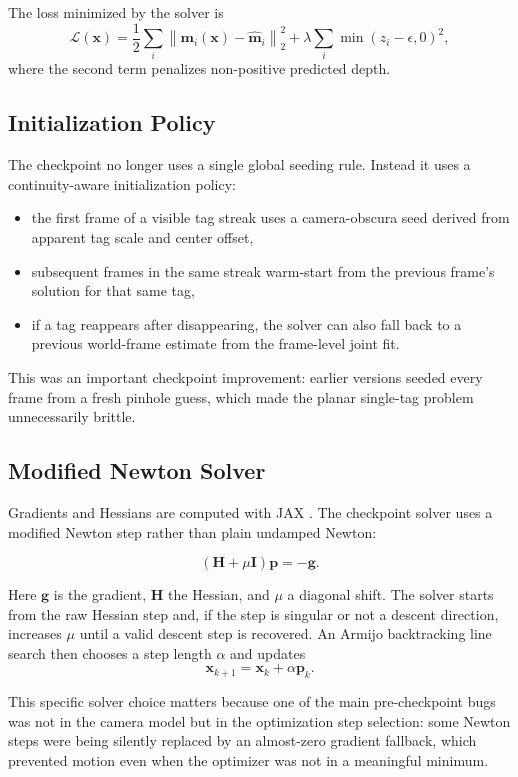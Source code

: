 \documentclass[11pt,a4paper]{article}
\begin{document}
The loss minimized by the solver is
\[
\mathcal{L}(\mathbf{x})
=
\frac{1}{2}\sum_i \left\lVert \mathbf{m}_i(\mathbf{x}) - \hat{\mathbf{m}}_i \right\rVert_2^2
+
\lambda \sum_i \min(z_i - \epsilon, 0)^2,
\]
where the second term penalizes non-positive predicted depth.

\subsection{Initialization Policy}

The checkpoint no longer uses a single global seeding rule.
Instead it uses a continuity-aware initialization policy:

\begin{itemize}
  \item the first frame of a visible tag streak uses a camera-obscura seed derived from apparent tag scale and center offset,
  \item subsequent frames in the same streak warm-start from the previous frame's solution for that same tag,
  \item if a tag reappears after disappearing, the solver can also fall back to a previous world-frame estimate from the frame-level joint fit.
\end{itemize}

This was an important checkpoint improvement: earlier versions seeded every frame from a fresh pinhole guess, which made the planar single-tag problem unnecessarily brittle.

\subsection{Modified Newton Solver}

Gradients and Hessians are computed with JAX \citep{bradbury2018jax}.
The checkpoint solver uses a modified Newton step rather than plain undamped Newton:

\[
(\mathbf{H} + \mu \mathbf{I}) \mathbf{p} = -\mathbf{g}.
\]

Here $\mathbf{g}$ is the gradient, $\mathbf{H}$ the Hessian, and $\mu$ a diagonal shift.
The solver starts from the raw Hessian step and, if the step is singular or not a descent direction, increases $\mu$ until a valid descent step is recovered.
An Armijo backtracking line search then chooses a step length $\alpha$ and updates
\[
\mathbf{x}_{k+1} = \mathbf{x}_k + \alpha \mathbf{p}_k.
\]

This specific solver choice matters because one of the main pre-checkpoint bugs was not in the camera model but in the optimization step selection: some Newton steps were being silently replaced by an almost-zero gradient fallback, which prevented motion even when the optimizer was not in a meaningful minimum.
\end{document}
